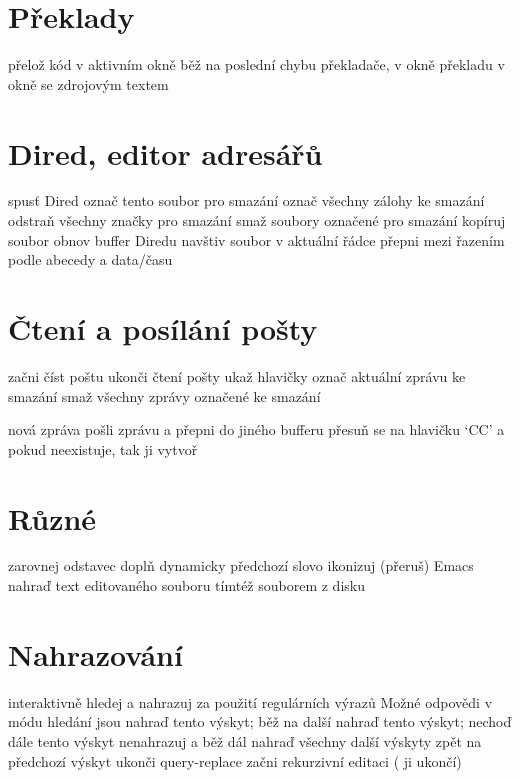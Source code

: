 \section{Překlady}

 přelož kód v aktivním okně
 běž na poslední chybu překladače, v okně překladu
 v okně se zdrojovým textem

\section{Dired, editor adresářů}

 spusť Dired
 označ tento soubor pro smazání
\key{\~{}} označ všechny zálohy ke smazání
 odstraň všechny značky pro smazání
 smaž soubory označené pro smazání
 kopíruj soubor
 obnov buffer Diredu
 navštiv soubor v aktuální řádce
 přepni mezi řazením podle abecedy a data/času

\section{Čtení a posílání pošty}

 začni číst poštu
 ukonči čtení pošty
 ukaž hlavičky
 označ aktuální zprávu ke smazání
 smaž všechny zprávy označené ke smazání

 nová zpráva
 pošli zprávu a přepni do jiného bufferu
 přesuň se na hlavičku `CC' a pokud neexistuje, tak ji
vytvoř

\section{Různé}

 zarovnej odstavec
 doplň dynamicky předchozí slovo
 ikonizuj (přeruš) Emacs
 nahraď text editovaného souboru tímtéž souborem z disku

\section{Nahrazování}

 interaktivně hledej a nahrazuj
 za použití regulárních výrazů
\askip
Možné odpovědi v módu hledání jsou
\askip
{} nahraď tento výskyt; běž na další
\key{,} nahraď tento výskyt; nechoď dále
 tento výskyt nenahrazuj a běž dál
\key{!} nahraď všechny další výskyty
\key{\^{}} zpět na předchozí výskyt
 ukonči query-replace
 začni rekurzivní editaci ( ji ukončí)

